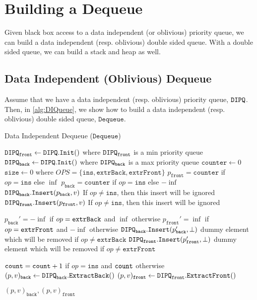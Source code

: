 \newcommand{\DeQ}{\texttt{Dequeue}}
\newcommand{\DeQAccess}{\texttt{Access}}
\newcommand{\DIPQFr}{\DIPQ_{\texttt{front}}}
\newcommand{\DIPQBack}{\DIPQ_{\texttt{back}}}
\newcommand{\DeQCouner}{\texttt{counter}}
\newcommand{\DeQSize}{\texttt{size}}
\newcommand{\DeQExtractFront}{\texttt{ExtractFront}}
\newcommand{\DeQExtractBack}{\texttt{ExtractBack}}

\section{Building a Dequeue}
Given black box access to a data independent (or oblivious) priority queue,
we can build a data independent (resp. oblivious) double sided queue.
With a double sided queue, we can build a stack and heap as well.

\subsection{Data Independent (Oblivious) Dequeue}
Assume that we have a data independent (resp. oblivious) priority queue, $\texttt{DIPQ}$.
Then, in \cref{alg:DIQueue}, we show how to build a data independent (resp. oblivious) double sided queue, $\DeQ$.

\begin{algorithm}
	\caption{Data Independent Dequeue ($\DeQ$)}
	\label{alg:DEQueue}
	\begin{algorithmic}[1]
		\Function{$\DIPQInit$}{}
		\State $\DIPQFr \gets \DIPQ.\DIPQInit()$ where $\DIPQFr$ is a min priority queue
		\State $\DIPQBack \gets \DIPQ.\DIPQInit()$ where $\DIPQBack$ is a max priority queue
		\State $\DeQCouner \gets 0$
		\State $\DeQSize \gets 0$
		\EndFunction
		\Function{$\DeQAccess$}{$v, op \in OPS$} \Comment where $OPS = \{\texttt{ins}, \texttt{extrBack}, \texttt{extrFront}\}$
			\State $p_{\texttt{front}} = \DeQCouner$ if $op = \texttt{ins}$ else $\inf$ 
			\State $p_{\texttt{back}} = \DeQCouner$ if $op = \texttt{ins}$ else $-\inf$
		 	\State $\DIPQBack.\DIPQInsert(p_{\texttt{back}}, v)$ \Comment If $op \neq \texttt{ins}$, then this insert will be ignored
		 	\State $\DIPQFr.\DIPQInsert(p_{\texttt{front}}, v)$ \Comment If $op \neq \texttt{ins}$, then this insert will be ignored

			\State $p_{\texttt{back}}' = -\inf$ if $op = \texttt{\texttt{extrBack}}$ and $\inf$ otherwise
			\State $p_{\texttt{front}}' = \inf$ if $op = \texttt{\texttt{extrFront}}$ and $-\inf$ otherwise
		 	\State $\DIPQBack.\DIPQInsert(p_{\texttt{back}}', \bot)$ \Comment dummy element which will be removed if $op \neq \texttt{extrBack}$
		 	\State $\DIPQFr.\DIPQInsert(p_{\texttt{front}}', \bot)$ \Comment dummy element which will be removed if $op \neq \texttt{extrFront}$

			\State ${\texttt{count}} = {\texttt{count}} + 1$ if $op = \texttt{ins}$ and ${\texttt{count}}$ otherwise
		 	\State $(p, v)_\texttt{back} \gets \DIPQBack.\texttt{ExtractBack}()$
		 	\State $(p, v)_\texttt{front} \gets \DIPQFr.\DIPQExtract()$

			\State \Return $(p, v)_\texttt{back}, (p, v)_\texttt{front}$
		\EndFunction
	\end{algorithmic}
\end{algorithm}

